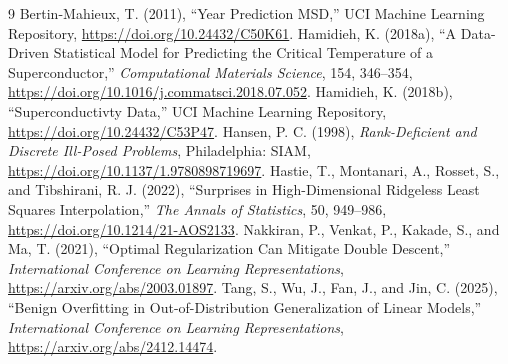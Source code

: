 \begin{thebibliography}{9}
 Bertin-Mahieux, T. (2011), “Year Prediction MSD,” UCI Machine Learning Repository, \url{https://doi.org/10.24432/C50K61}.
 Hamidieh, K. (2018a), “A Data-Driven Statistical Model for Predicting the Critical Temperature of a Superconductor,” \emph{Computational Materials Science}, 154, 346--354, \url{https://doi.org/10.1016/j.commatsci.2018.07.052}.
 Hamidieh, K. (2018b), “Superconductivty Data,” UCI Machine Learning Repository, \url{https://doi.org/10.24432/C53P47}.
 Hansen, P. C. (1998), \emph{Rank-Deficient and Discrete Ill-Posed Problems}, Philadelphia: SIAM, \url{https://doi.org/10.1137/1.9780898719697}.
 Hastie, T., Montanari, A., Rosset, S., and Tibshirani, R. J. (2022), “Surprises in High-Dimensional Ridgeless Least Squares Interpolation,” \emph{The Annals of Statistics}, 50, 949--986, \url{https://doi.org/10.1214/21-AOS2133}.
 Nakkiran, P., Venkat, P., Kakade, S., and Ma, T. (2021), “Optimal Regularization Can Mitigate Double Descent,” \emph{International Conference on Learning Representations}, \url{https://arxiv.org/abs/2003.01897}.
 Tang, S., Wu, J., Fan, J., and Jin, C. (2025), “Benign Overfitting in Out-of-Distribution Generalization of Linear Models,” \emph{International Conference on Learning Representations}, \url{https://arxiv.org/abs/2412.14474}.
\end{thebibliography}
